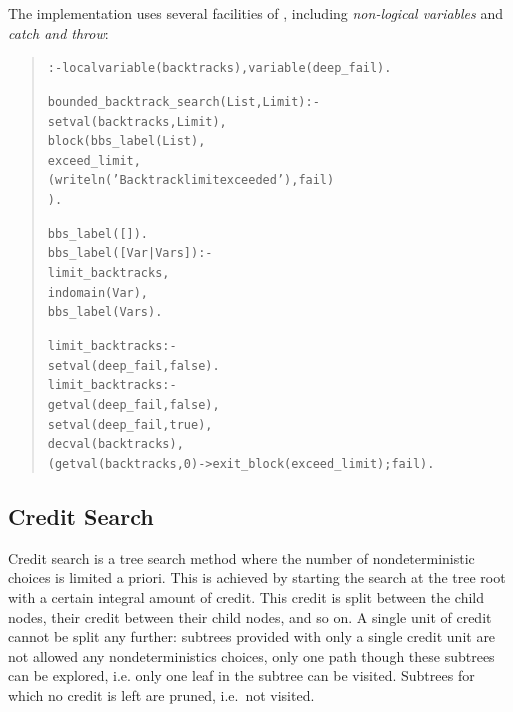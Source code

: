 The implementation uses several
facilities of {\eclipse}, including {\em non-logical variables} and
{\em catch and throw}:
\begin{quote}\begin{alltt}
:- local variable(backtracks), variable(deep_fail).

bounded_backtrack_search(List,Limit) :-
        setval(backtracks,Limit),
        block(bbs_label(List),
              exceed_limit,
              (writeln('Backtrack limit exceeded'), fail)
             ).

bbs_label([]).
bbs_label([Var|Vars]) :-
        limit_backtracks,
        indomain(Var),
        bbs_label(Vars).
    
limit_backtracks :-
        setval(deep_fail,false).
limit_backtracks :-
        getval(deep_fail,false),        %
        setval(deep_fail,true),
        decval(backtracks),
        (getval(backtracks,0) -> exit_block(exceed_limit) ; fail).
\end{alltt}\end{quote}


\subsection{Credit Search}

Credit search is a tree search method where the number of
nondeterministic choices is limited a priori.  This is achieved by
starting the search at the tree root with a certain integral amount of
credit.  This credit is split between the child nodes, their credit
between their child nodes, and so on.  A single unit of credit cannot
be split any further: subtrees provided with only a single credit unit
are not allowed any nondeterministics choices, only one path though these
subtrees can be explored, i.e. only one leaf in the subtree can be visited.
Subtrees for which no credit is left are pruned,
i.e.\ not visited.

